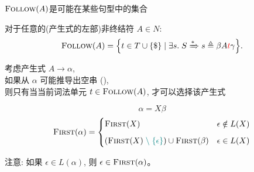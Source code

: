\begin{frame}{}
  \begin{center}

    \vspace{0.60cm}
    $\follow(A)$是可能在某些句型中的集合
    \begin{definition}[$\follow(A)$集合]
        对于任意的(产生式的左部)非终结符 $A \in N:$
        \[
          \textsc{Follow}(A) = \Big\{t \in T \cup \{\$\}
            \mid \exists s.\; S \xRightarrow[]{\ast} s \triangleq \beta A\textcolor{red}{t} \gamma\Big\}.
        \]
    \end{definition}

    \pause
    \vspace{0.60cm}
    考虑产生式 $A \to \alpha$, \\[4pt]
    如果从 $\alpha$ 可能推导出空串 (\red{$\alpha \dstar \epsilon$}), \\[4pt]
    则只有当当前词法单元 $t \in \textsc{Follow}(A)$, 才可以选择该产生式
  \end{center}
\end{frame}

\begin{frame}{}
  \begin{center}

    

    \pause
  \end{center}
\end{frame}

\begin{frame}{}
  \begin{center}

    \[
      \alpha = X \beta
    \]
    \[
      \textsc{First}(\alpha) =
      \begin{cases}
        \textsc{First}(X) & \epsilon \notin L(X) \\[6pt]
        (\textsc{First}(X) \;\textcolor{teal}{\setminus\; \{\epsilon\}}) \cup \textsc{First}(\beta) & \epsilon \in L(X)
      \end{cases}
    \]

    \vspace{0.60cm}
    注意: 如果 $\epsilon \in L(\alpha)$, 则 $\epsilon \in \textsc{First}(\alpha)$。
  \end{center}
\end{frame}

